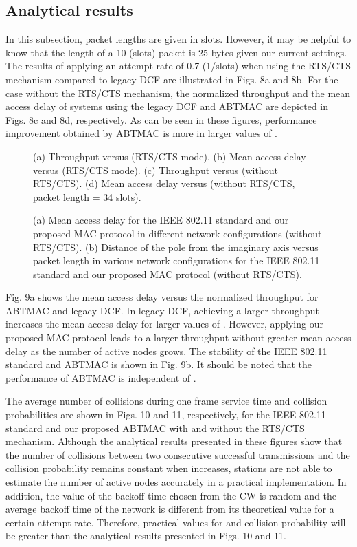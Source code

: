 \documentclass[10pt,twocolumn,oneside,submit]{JCNtran}
\begin{document}
\subsection{Analytical results}
\par In this subsection, packet lengths are given in slots. However, it may be helpful to know that the length of a 10 (slots) packet is 25 bytes given our current settings. The results of applying an attempt rate of 0.7 (1/slots) when using the RTS/CTS mechanism compared to legacy DCF are illustrated in Figs. 8a and 8b. For the case without the RTS/CTS mechanism, the normalized throughput and the mean access delay of systems using the legacy DCF and ABTMAC are depicted in Figs. 8c and 8d, respectively. As can be seen in these figures, performance improvement obtained by ABTMAC is more in larger values of .
\begin{figure*}[!t]
\begin{center}
\epsfxsize=16cm \leavevmode{} \caption{(a) Throughput versus  (RTS/CTS mode). (b) Mean access delay versus  (RTS/CTS mode). (c) Throughput versus  (without RTS/CTS). (d) Mean access delay versus  (without RTS/CTS, packet length = 34 slots).} \label{fig:8}
\end{center}
\end{figure*}
\begin{figure*}[t]
\begin{center}
\epsfxsize=16cm \leavevmode{} \caption{(a) Mean access delay for the IEEE 802.11 standard and our proposed MAC protocol in different network configurations (without RTS/CTS). (b) Distance of the pole from the imaginary axis versus packet length in various network configurations for the IEEE 802.11 standard and our proposed MAC protocol (without RTS/CTS).} \label{fig:9}
\end{center}
\end{figure*}
\par Fig. 9a shows the mean access delay versus the normalized throughput for ABTMAC and legacy DCF. In legacy DCF, achieving a larger throughput increases the mean access delay for larger values of . However, applying our proposed MAC protocol leads to a larger throughput without greater mean access delay as the number of active nodes grows. The stability of the IEEE 802.11 standard and ABTMAC is shown in Fig. 9b. It should be noted that the performance of ABTMAC is independent of .
\par The average number of collisions during one frame service time and collision probabilities are shown in Figs. 10 and 11, respectively, for the IEEE 802.11 standard and our proposed ABTMAC with and without the RTS/CTS mechanism. Although the analytical results presented in these figures show that the number of collisions between two consecutive successful transmissions and the collision probability remains constant when  increases, stations are not able to estimate the number of active nodes accurately in a practical implementation. In addition, the value of the backoff time chosen from the CW is random and the average backoff time of the network is different from its theoretical value for a certain attempt rate. Therefore, practical values for  and collision probability will be greater than the analytical results presented in Figs. 10 and 11.
\end{document}
